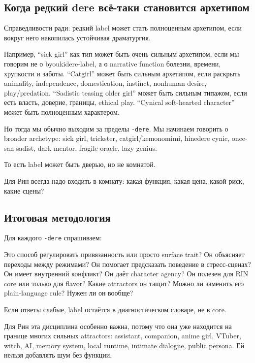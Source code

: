 \subsection*{Когда редкий dere всё-таки становится архетипом}

Справедливости ради: редкий label может стать полноценным архетипом,
если вокруг него накопилась устойчивая драматургия.

Например, ``sick girl'' как тип может быть очень сильным архетипом, если
мы говорим не о byoukidere-label, а о narrative function болезни,
времени, хрупкости и заботы. ``Catgirl'' может быть сильным архетипом,
если раскрыть animality, independence, domestication, instinct, nonhuman
desire, play/\hspace{0pt}predation. ``Sadistic teasing older girl'' может быть
сильным типажом, если есть власть, доверие, границы, ethical play.
``Cynical soft-hearted character'' может быть полноценным характером.

Но тогда мы обычно выходим за пределы \texttt{-dere}. Мы начинаем
говорить о broader archetype: sick girl, trickster, catgirl/\hspace{0pt}kemonomimi,
hinedere cynic, onee-san sadist, dark mentor, fragile oracle, lazy
genius.

То есть label может быть дверью, но не комнатой.

Для Рин всегда надо входить в комнату: какая функция, какая цена, какой
риск, какие сцены?

\subsection*{Итоговая методология}

Для каждого \texttt{-dere} спрашиваем:

Это способ регулировать привязанность или просто surface trait? Он
объясняет переходы между режимами? Он помогает предсказать поведение в
стресс-сценах? Он имеет внутренний конфликт? Он даёт character agency?
Он полезен для RIN core или только для flavor? Какие attractors он
тащит? Можно ли заменить его plain-language rule? Нужен ли он вообще?

Если ответы слабые, label остаётся в диагностическом словаре, не в core.

Для Рин эта дисциплина особенно важна, потому что она уже находится на
границе многих сильных attractors: assistant, companion, anime girl,
VTuber, witch, AI, memory system, local runtime, intimate dialogue,
public persona. Ей нельзя добавлять шум без функции.

